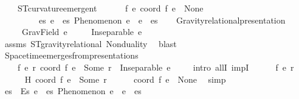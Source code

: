 \begin{isabellebody}
\ \ \ \ ST{}{\isacharunderscore}{\kern0pt}curvature{\isacharunderscore}{\kern0pt}emergent{\isacharcolon}{\kern0pt}\isanewline
\ \ \ \ \ \ {\isachardoublequoteopen}{\isasymforall}f\ e{\isachardot}{\kern0pt}\ coord\ f\ e\ {\isasymnoteq}\ None\ {\isasymlongrightarrow}\isanewline
\ \ \ \ \ \ \ \ \ {\isacharparenleft}{\kern0pt}{\isasymexists}es{\isachardot}{\kern0pt}\ {\isacharparenleft}{\kern0pt}{\isasymforall}e{\isacharprime}{\kern0pt}\ {\isasymin}\ es{\isachardot}{\kern0pt}\ Phenomenon\ e{\isacharprime}{\kern0pt}{\isacharparenright}{\kern0pt}\ {\isasymand}\ e\ {\isasymin}\ es{\isacharparenright}{\kern0pt}{\isachardoublequoteclose}\isanewline
\isanewline
\ \ \isamarkupfalse%
\ Gravity{\isacharunderscore}{\kern0pt}relational{\isacharunderscore}{\kern0pt}presentation{\isacharcolon}{\kern0pt}\isanewline
\ \ \ \ \ {\isachardoublequoteopen}GravField\ e{\isachardoublequoteclose}\isanewline
\ \ \ \ \ {\isachardoublequoteopen}Inseparable\ e\ {\isasymOmega}{\isachardoublequoteclose}\isanewline
%
\isadelimproof
\ \ \ \ %
\endisadelimproof
%
\isatagproof
{}\isamarkupfalse%
\ assms\ ST{}{\isacharunderscore}{\kern0pt}gravity{\isacharunderscore}{\kern0pt}relational\ Nonduality\ \isamarkupfalse%
\ blast%
\endisatagproof
{\isafoldproof}%
%
\isadelimproof
\isanewline
%
\endisadelimproof
\isanewline
\ \ \isanewline
\ \ \isamarkupfalse%
\ Spacetime{\isacharunderscore}{\kern0pt}emerges{\isacharunderscore}{\kern0pt}from{\isacharunderscore}{\kern0pt}presentations{\isacharcolon}{\kern0pt}\isanewline
\ \ \ \ {\isachardoublequoteopen}{\isasymforall}f\ e\ r{\isachardot}{\kern0pt}\ coord\ f\ e\ {\isacharequal}{\kern0pt}\ Some\ r\ {\isasymlongrightarrow}\ Inseparable\ e\ {\isasymOmega}{\isachardoublequoteclose}\isanewline
%
\isadelimproof
\ \ %
\endisadelimproof
%
\isatagproof
{}\isamarkupfalse%
\ {\isacharparenleft}{\kern0pt}intro\ allI\ impI{\isacharparenright}{\kern0pt}\isanewline
\ \ \ \ \isamarkupfalse%
\ f\ e\ r\isanewline
\ \ \ \ \isamarkupfalse%
\ H{\isacharcolon}{\kern0pt}\ {\isachardoublequoteopen}coord\ f\ e\ {\isacharequal}{\kern0pt}\ Some\ r{\isachardoublequoteclose}\isanewline
\ \ \ \ \isamarkupfalse%
\ {\isachardoublequoteopen}coord\ f\ e\ {\isasymnoteq}\ None{\isachardoublequoteclose}\ \isamarkupfalse%
\ simp\isanewline
\ \ \ \ \isamarkupfalse%
\ \isamarkupfalse%
\ es\ \ Es{\isacharcolon}{\kern0pt}\ {\isachardoublequoteopen}{\isacharparenleft}{\kern0pt}{\isasymforall}e{\isacharprime}{\kern0pt}\ {\isasymin}\ es{\isachardot}{\kern0pt}\ Phenomenon\ e{\isacharprime}{\kern0pt}{\isacharparenright}{\kern0pt}\ {\isasymand}\ e\ {\isasymin}\ es{\isachardoublequoteclose}\isanewline

\end{isabellebody}
